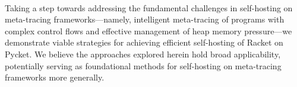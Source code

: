       \paragraph{}%
        Taking a step towards addressing the fundamental challenges in self-hosting on meta-tracing frameworks—namely, intelligent meta-tracing of programs with complex control flows and effective management of heap memory pressure—we demonstrate viable strategies for achieving efficient self-hosting of Racket on Pycket. We believe the approaches explored herein hold broad applicability, potentially serving as foundational methods for self-hosting on meta-tracing frameworks more generally.



